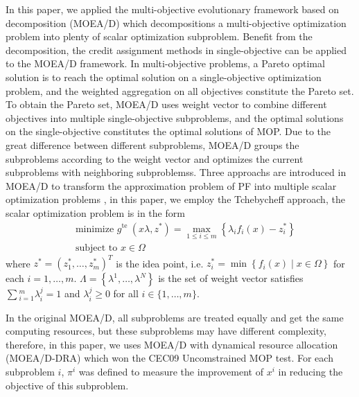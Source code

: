 \documentclass[journal]{IEEEtran}
\begin{document}
In this paper, we applied the multi-objective evolutionary framework based on decomposition (MOEA/D) \cite{moead} which decompositions a multi-objective optimization problem into plenty of scalar optimization subproblem. Benefit from the decomposition, the credit assignment methods in single-objective can be applied to the MOEA/D framework.
In multi-objective problems, a Pareto optimal solution is to reach the optimal solution on a single-objective optimization problem, and the weighted aggregation on all objectives constitute the Pareto set.
To obtain the Pareto set, MOEA/D uses weight vector to combine different objectives into multiple single-objective subproblems, and the optimal solutions on the single-objective constitutes the optimal solutions of MOP.
Due to the great difference between different subproblems, MOEA/D groups the subproblems according to the weight vector and optimizes the current subproblems with neighboring subproblemss.
Three approachs are introduced in MOEA/D to transform the approximation problem of PF into multiple scalar optimization problems \cite{moead}, in this paper, we employ the Tchebycheff approach, the scalar optimization problem is in the form
\begin{equation}
  \begin{aligned}
     & \text { minimize } g^{\text {te }}\left(x \lambda, z^{*}\right)=\max _{1 \leq i \leq m}\left\{\lambda_{i} f_{i}(x)-z_{i}^{*}\right\} \\
     & \text { subject to } x \in \Omega
  \end{aligned}
\end{equation}
where $z^{*}=\left(z_{1}^{*}, \ldots, z_{m}^{*}\right)^{T}$ is the idea point, i.e. $z_{i}^{*}=\min \left\{f_{i}(x) \mid x \in \Omega\right\}$ for each $i = 1, \dots , m$. $\Lambda=\left\{\lambda^{1}, \ldots, \lambda^{N}\right\}$ is the set of weight vector satisfies $\sum{^m_{i=1} \lambda ^j_i=1}$ and $\lambda^j_i \geq 0$ for all $i \in \{1,\dots, m\}$.

In the original MOEA/D, all subproblems are treated equally and get the same computing resources,
but these subproblems may have different complexity, therefore, in this paper, we uses MOEA/D with dynamical resource allocation (MOEA/D-DRA) \cite{moead-dra} which won the CEC09 Uncomstrained MOP test.
For each subproblem $i$, $\pi^i$ was defined to measure the improvement of $x^i$ in reducing the objective of this subproblem.
\end{document}
